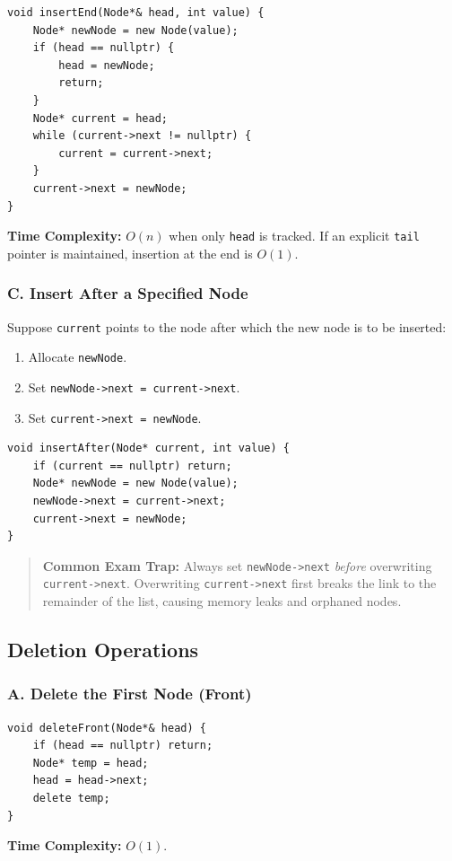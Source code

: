 \begin{lstlisting}[style=cppstyle]
void insertEnd(Node*& head, int value) {
    Node* newNode = new Node(value);
    if (head == nullptr) {
        head = newNode;
        return;
    }
    Node* current = head;
    while (current->next != nullptr) {
        current = current->next;
    }
    current->next = newNode;
}
\end{lstlisting}

\textbf{Time Complexity:} $O(n)$ when only \texttt{head} is tracked. If an explicit \texttt{tail} pointer is maintained, insertion at the end is $O(1)$.

\subsubsection{C. Insert After a Specified Node}
Suppose \texttt{current} points to the node after which the new node is to be inserted:
\begin{enumerate}
    \item Allocate \texttt{newNode}.
    \item Set \texttt{newNode->next = current->next}.
    \item Set \texttt{current->next = newNode}.
\end{enumerate}

\begin{lstlisting}[style=cppstyle]
void insertAfter(Node* current, int value) {
    if (current == nullptr) return;
    Node* newNode = new Node(value);
    newNode->next = current->next;
    current->next = newNode;
}
\end{lstlisting}

\begin{quote}
\textbf{Common Exam Trap:} Always set \texttt{newNode->next} \emph{before} overwriting \texttt{current->next}. Overwriting \texttt{current->next} first breaks the link to the remainder of the list, causing memory leaks and orphaned nodes.
\end{quote}

\subsection{Deletion Operations}

\subsubsection{A. Delete the First Node (Front)}
\begin{lstlisting}[style=cppstyle]
void deleteFront(Node*& head) {
    if (head == nullptr) return;
    Node* temp = head;
    head = head->next;
    delete temp;
}
\end{lstlisting}
\textbf{Time Complexity:} $O(1)$.

